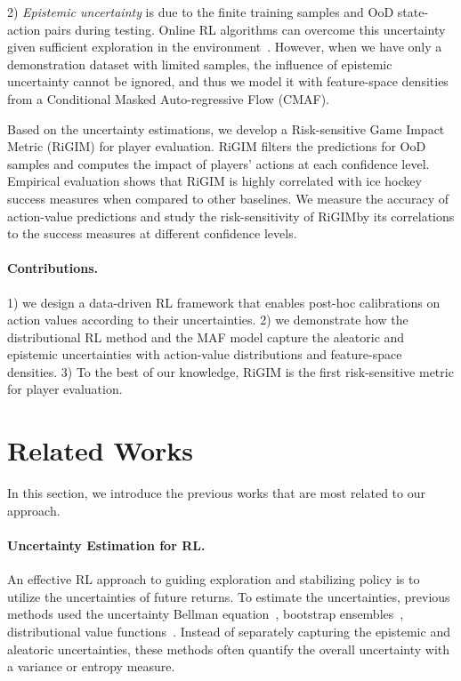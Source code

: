\documentclass{article}
\newcommand{\sys}{RiGIM}
\newcommand{\system}{\sys\;}
\begin{document}
2) {\it Epistemic uncertainty} is due to the finite training samples and OoD state-action pairs during testing. Online RL algorithms can overcome this uncertainty given sufficient exploration in the environment~\cite{Mavrin2019DistributionalRL}. However, when we have only a demonstration dataset with limited samples, the influence of epistemic uncertainty cannot be ignored, and thus we model it with feature-space densities from a Conditional Masked Auto-regressive Flow (CMAF).

Based on the uncertainty estimations, we develop a Risk-sensitive Game Impact Metric (RiGIM) for player evaluation. RiGIM filters the predictions for OoD samples and computes the impact of players' actions at each confidence level.
Empirical evaluation shows that RiGIM is highly correlated with ice hockey success measures when compared to other baselines. 
We measure the accuracy of action-value predictions and study the risk-sensitivity of \system by its correlations to the success measures at different confidence levels.

\paragraph{Contributions.} 1) we design a data-driven RL framework that enables post-hoc calibrations on action values according to their uncertainties. 2) we demonstrate how the distributional RL method and the MAF model capture the aleatoric and epistemic uncertainties with action-value distributions and feature-space densities. 3) To the best of our knowledge, RiGIM is the first risk-sensitive metric for player evaluation.

\vspace{-0.05in}
\section{Related Works}
In this section, we introduce the previous works that are most related to our approach.
\paragraph{Uncertainty Estimation for RL.} 
An effective RL approach to guiding exploration and stabilizing policy is to utilize the uncertainties of future returns. To estimate the uncertainties, previous methods used the uncertainty Bellman equation~\cite{ODonoghue2018UncertaintyBellman}, bootstrap ensembles~\cite{Chen2017QEnsembles,Kumar2019Stable,Yu2020MOPO}, distributional value functions~\cite{Tang2018DistribExplore,Zhang2019QUOTA,Mavrin2019DistributionalRL}. Instead of separately capturing the epistemic and aleatoric uncertainties, these methods often quantify the overall uncertainty with a variance or entropy measure. 
\end{document}
